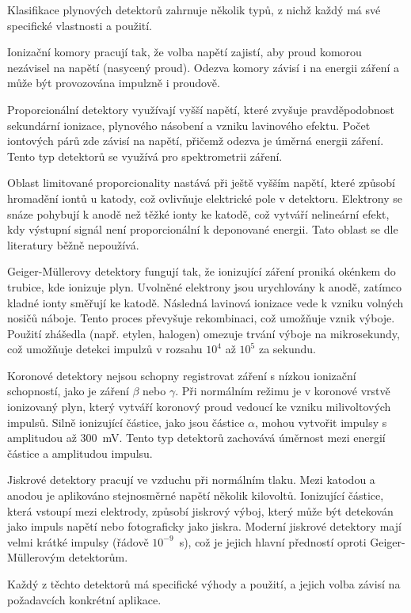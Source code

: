 Klasifikace plynových detektorů zahrnuje několik typů, z nichž každý má své specifické vlastnosti a použití.

Ionizační komory pracují tak, že volba napětí zajistí, aby proud komorou nezávisel na napětí (nasycený proud). Odezva komory závisí i na energii záření a může být provozována impulzně i proudově.

Proporcionální detektory využívají vyšší napětí, které zvyšuje pravděpodobnost sekundární ionizace, plynového násobení a vzniku lavinového efektu. Počet iontových párů zde závisí na napětí, přičemž odezva je úměrná energii záření. Tento typ detektorů se využívá pro spektrometrii záření.

Oblast limitované proporcionality nastává při ještě vyšším napětí, které způsobí hromadění iontů u katody, což ovlivňuje elektrické pole v detektoru. Elektrony se snáze pohybují k anodě než těžké ionty ke katodě, což vytváří nelineární efekt, kdy výstupní signál není proporcionální k deponované energii. Tato oblast se dle literatury běžně nepoužívá.

Geiger-Müllerovy detektory fungují tak, že ionizující záření proniká okénkem do trubice, kde ionizuje plyn. Uvolněné elektrony jsou urychlovány k anodě, zatímco kladné ionty směřují ke katodě. Následná lavinová ionizace vede k vzniku volných nosičů náboje. Tento proces převyšuje rekombinaci, což umožňuje vznik výboje. Použití zhášedla (např. etylen, halogen) omezuje trvání výboje na mikrosekundy, což umožňuje detekci impulzů v rozsahu $10^4$ až $10^5$ za sekundu.

Koronové detektory nejsou schopny registrovat záření s nízkou ionizační schopností, jako je záření $\beta$ nebo $\gamma$. Při normálním režimu je v koronové vrstvě ionizovaný plyn, který vytváří koronový proud vedoucí ke vzniku milivoltových impulsů. Silně ionizující částice, jako jsou částice $\alpha$, mohou vytvořit impulsy s amplitudou až 300~mV. Tento typ detektorů zachovává úměrnost mezi energií částice a amplitudou impulsu.

Jiskrové detektory pracují ve vzduchu při normálním tlaku. Mezi katodou a anodou je aplikováno stejnosměrné napětí několik kilovoltů. Ionizující částice, která vstoupí mezi elektrody, způsobí jiskrový výboj, který může být detekován jako impuls napětí nebo fotograficky jako jiskra. Moderní jiskrové detektory mají velmi krátké impulsy (řádově $10^{-9}$~s), což je jejich hlavní předností oproti Geiger-Müllerovým detektorům.

Každý z těchto detektorů má specifické výhody a použití, a jejich volba závisí na požadavcích konkrétní aplikace.

